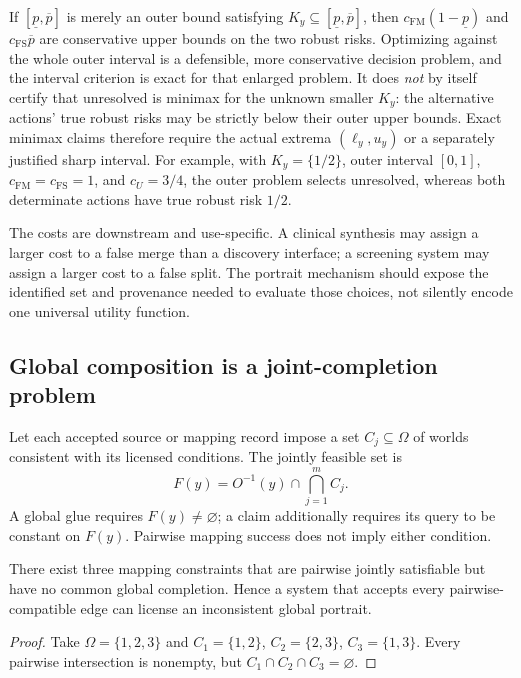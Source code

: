 If $[\underline p,\overline p]$ is merely an outer bound satisfying
$K_y\subseteq[\underline p,\overline p]$, then
$c_{\mathrm{FM}}(1-\underline p)$ and
$c_{\mathrm{FS}}\overline p$ are conservative upper bounds on the two robust
risks. Optimizing against the whole outer interval is a defensible, more
conservative decision problem, and the interval criterion is exact for that
enlarged problem. It does \emph{not} by itself certify that unresolved is
minimax for the unknown smaller $K_y$: the alternative actions' true robust
risks may be strictly below their outer upper bounds. Exact minimax claims
therefore require the actual extrema $(\ell_y,u_y)$ or a separately justified
sharp interval. For example, with $K_y=\{1/2\}$, outer interval $[0,1]$,
$c_{\mathrm{FM}}=c_{\mathrm{FS}}=1$, and $c_U=3/4$, the outer problem selects
unresolved, whereas both determinate actions have true robust risk $1/2$.

The costs are downstream and use-specific. A clinical synthesis may assign a
larger cost to a false merge than a discovery interface; a screening system
may assign a larger cost to a false split. The portrait mechanism should
expose the identified set and provenance needed to evaluate those choices,
not silently encode one universal utility function.

\subsection{Global composition is a joint-completion problem}

Let each accepted source or mapping record impose a set
$C_j\subseteq\Omega$ of worlds consistent with its licensed conditions. The
jointly feasible set is
\begin{equation}
  F(y)=O^{-1}(y)\cap\bigcap_{j=1}^{m}C_j.
  \label{eq:joint-completion}
\end{equation}
A global glue requires $F(y)\neq\varnothing$; a claim additionally requires
its query to be constant on $F(y)$. Pairwise mapping success does not imply
either condition.

\begin{proposition}
\label{prop:pairwise}
There exist three mapping constraints that are pairwise jointly satisfiable
but have no common global completion. Hence a system that accepts every
pairwise-compatible edge can license an inconsistent global portrait.
\end{proposition}

\begin{proof}
Take $\Omega=\{1,2,3\}$ and
$C_1=\{1,2\}$, $C_2=\{2,3\}$, $C_3=\{1,3\}$. Every pairwise intersection is
nonempty, but $C_1\cap C_2\cap C_3=\varnothing$.
\end{proof}

